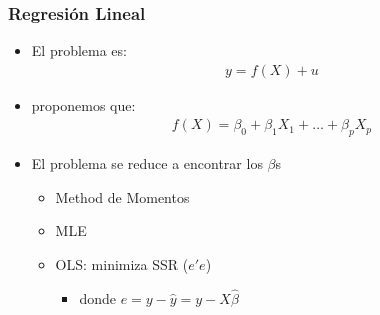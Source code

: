 \documentclass[
  shownotes,
  xcolor={svgnames},
  hyperref={colorlinks,citecolor=DarkBlue,linkcolor=DarkRed,urlcolor=DarkBlue}
  , aspectratio=169]{beamer}
\begin{document}
\begin{frame}
\frametitle{Regresión Lineal}

\begin{itemize}


\item El problema es:
\begin{align}
y=f(X)+u
\end{align}

\item proponemos que:
\begin{align}
  f(X) = \beta_0 + \beta_1 X_1 + \dots + \beta_p X_p 
\end{align}

\item El problema se reduce a encontrar los $\beta$s

\begin{itemize}
  \footnotesize
  \item Method de Momentos 
  \item MLE 
  \item OLS: minimiza SSR ($e'e$) 
  \begin{itemize}
    \tiny
  \item donde $e=y-\hat y=y-X\hat\beta$
  \end{itemize}  
\end{itemize}



\end{itemize}
\end{frame}


\end{document}
